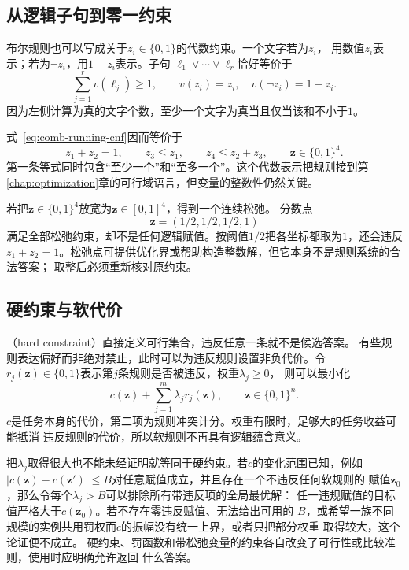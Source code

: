 \subsection{从逻辑子句到零一约束}

布尔规则也可以写成关于$z_i\in\{0,1\}$的代数约束。一个文字若为$z_i$，
用数值$z_i$表示；若为$\neg z_i$，用$1-z_i$表示。子句
$\ell_1\lor\cdots\lor\ell_r$恰好等价于
\begin{equation}
  \sum_{j=1}^{r}v(\ell_j)\geq1,
  \qquad
  v(z_i)=z_i,\quad v(\neg z_i)=1-z_i.
  \label{eq:comb-clause-linearization}
\end{equation}
因为左侧计算为真的文字个数，至少一个文字为真当且仅当该和不小于$1$。

式~\eqref{eq:comb-running-cnf}因而等价于
\begin{equation}
  z_1+z_2=1,\qquad
  z_3\leq z_1,\qquad
  z_4\leq z_2+z_3,\qquad
  \bm{z}\in\{0,1\}^4.
  \label{eq:comb-running-integer-constraints}
\end{equation}
第一条等式同时包含“至少一个”和“至多一个”。这个代数表示把规则接到第
\ref{chap:optimization}章的可行域语言，但变量的整数性仍然关键。

若把$\bm{z}\in\{0,1\}^4$放宽为$\bm{z}\in[0,1]^4$，得到一个连续松弛。
分数点
\[
  \bm{z}=(1/2,1/2,1/2,1)
\]
满足全部松弛约束，却不是任何逻辑赋值。按阈值$1/2$把各坐标都取为$1$，还会违反
$z_1+z_2=1$。松弛点可提供优化界或帮助构造整数解，但它本身不是规则系统的合法答案；
取整后必须重新核对原约束。

\subsection{硬约束与软代价}

（hard constraint）直接定义可行集合，违反任意一条就不是候选答案。
有些规则表达偏好而非绝对禁止，此时可以为违反规则设置非负代价。令
$r_j(\bm{z})\in\{0,1\}$表示第$j$条规则是否被违反，权重$\lambda_j\geq0$，
则可以最小化
\begin{equation}
  c(\bm{z})+\sum_{j=1}^{m}\lambda_j r_j(\bm{z}),
  \qquad
  \bm{z}\in\{0,1\}^n.
  \label{eq:comb-soft-constraint-objective}
\end{equation}
$c$是任务本身的代价，第二项为规则冲突计分。权重有限时，足够大的任务收益可能抵消
违反规则的代价，所以软规则不再具有逻辑蕴含意义。

把$\lambda_j$取得很大也不能未经证明就等同于硬约束。若$c$的变化范围已知，例如
$|c(\bm{z})-c(\bm{z}')|\leq B$对任意赋值成立，并且存在一个不违反任何软规则的
赋值$\bm{z}_0$，那么令每个$\lambda_j>B$可以排除所有带违反项的全局最优解：
任一违规赋值的目标值严格大于$c(\bm{z}_0)$。若不存在零违反赋值、无法给出可用的
$B$，或希望一族不同规模的实例共用罚权而$c$的振幅没有统一上界，或者只把部分权重
取得较大，这个论证便不成立。
硬约束、罚函数和带松弛变量的约束各自改变了可行性或比较准则，使用时应明确允许返回
什么答案。

